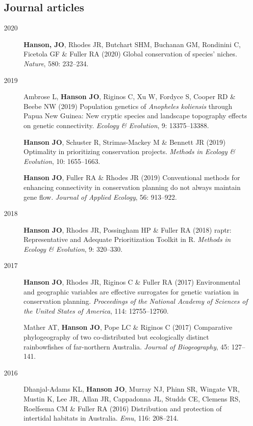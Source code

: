 \documentclass[12pt,a4paper]{article}
\begin{document}
\subsection*{Journal articles}
\begin{description}

\item[2020] \textbf{Hanson, JO}, Rhodes JR, Butchart SHM, Buchanan GM, Rondinini C, Ficetola GF \& Fuller RA (2020) Global conservation of species' niches. \textit{Nature}, 580: 232--234.

\item[2019] Ambrose L, \textbf{Hanson JO}, Riginos C, Xu W, Fordyce S, Cooper RD \& Beebe NW (2019) Population genetics of \textit{Anopheles koliensis} through Papua New Guinea: New cryptic species and landscape topography effects on genetic connectivity. \textit{Ecology \& Evolution}, 9: 13375--13388.

\item[] \textbf{Hanson JO}, Schuster R, Strimas-Mackey M \& Bennett JR (2019) Optimality in prioritizing conservation projects. \textit{Methods in Ecology \& Evolution}, 10: 1655--1663.

\item[] \textbf{Hanson JO}, Fuller RA \& Rhodes JR (2019) Conventional methods for enhancing connectivity in conservation planning do not always maintain gene flow. \textit{Journal of Applied Ecology}, 56: 913--922.

\item[2018] \textbf{Hanson JO}, Rhodes JR, Possingham HP \& Fuller RA (2018) raptr: Representative and Adequate Prioritization Toolkit in R. \textit{Methods in Ecology \& Evolution}, 9: 320--330.

\item[2017] \textbf{Hanson JO}, Rhodes JR, Riginos C \& Fuller RA (2017) Environmental and geographic variables are effective surrogates for genetic variation in conservation planning. \textit{Proceedings of the National Academy of Sciences of the United States of America}, 114: 12755--12760.

\item[] Mather AT, \textbf{Hanson JO}, Pope LC \& Riginos C (2017) Comparative phylogeography of two co-distributed but ecologically distinct rainbowfishes of far-northern Australia. \textit{Journal of Biogeography}, 45: 127--141.

\item[2016] Dhanjal-Adams KL, \textbf{Hanson JO}, Murray NJ, Phinn SR, Wingate VR, Mustin K, Lee JR, Allan JR, Cappadonna JL, Studds CE, Clemens RS, Roelfsema CM \& Fuller RA (2016) Distribution and protection of intertidal habitats in Australia. \textit{Emu}, 116: 208--214.


\end{description}
\end{document}
